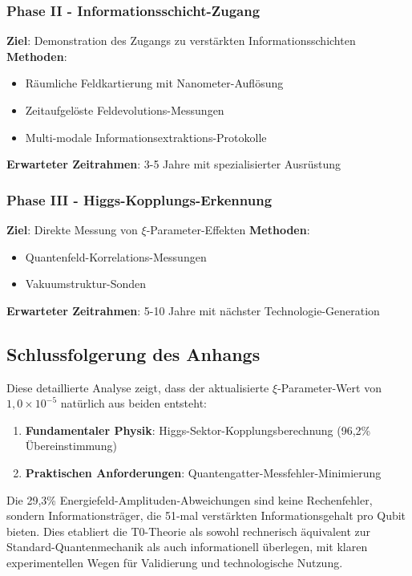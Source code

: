 \documentclass[12pt,a4paper]{article}
\begin{document}
	\subsubsection{Phase II - Informationsschicht-Zugang}
	
	\textbf{Ziel}: Demonstration des Zugangs zu verstärkten Informationsschichten
	\textbf{Methoden}:
	\begin{itemize}
		\item Räumliche Feldkartierung mit Nanometer-Auflösung
		\item Zeitaufgelöste Feldevolutions-Messungen
		\item Multi-modale Informationsextraktions-Protokolle
	\end{itemize}
	\textbf{Erwarteter Zeitrahmen}: 3-5 Jahre mit spezialisierter Ausrüstung
	
	\subsubsection{Phase III - Higgs-Kopplungs-Erkennung}
	
	\textbf{Ziel}: Direkte Messung von $\xi$-Parameter-Effekten
	\textbf{Methoden}:
	\begin{itemize}
		\item Quantenfeld-Korrelations-Messungen
		\item Vakuumstruktur-Sonden
	\end{itemize}
	\textbf{Erwarteter Zeitrahmen}: 5-10 Jahre mit nächster Technologie-Generation
	
	\subsection{Schlussfolgerung des Anhangs}
	
	Diese detaillierte Analyse zeigt, dass der aktualisierte $\xi$-Parameter-Wert von $1,0 \times 10^{-5}$ natürlich aus beiden entsteht:
	\begin{enumerate}
		\item \textbf{Fundamentaler Physik}: Higgs-Sektor-Kopplungsberechnung (96,2\% Übereinstimmung)
		\item \textbf{Praktischen Anforderungen}: Quantengatter-Messfehler-Minimierung
	\end{enumerate}
	
	Die 29,3\% Energiefeld-Amplituden-Abweichungen sind keine Rechenfehler, sondern Informationsträger, die 51-mal verstärkten Informationsgehalt pro Qubit bieten. Dies etabliert die T0-Theorie als sowohl rechnerisch äquivalent zur Standard-Quantenmechanik als auch informationell überlegen, mit klaren experimentellen Wegen für Validierung und technologische Nutzung.
	
\end{document}
